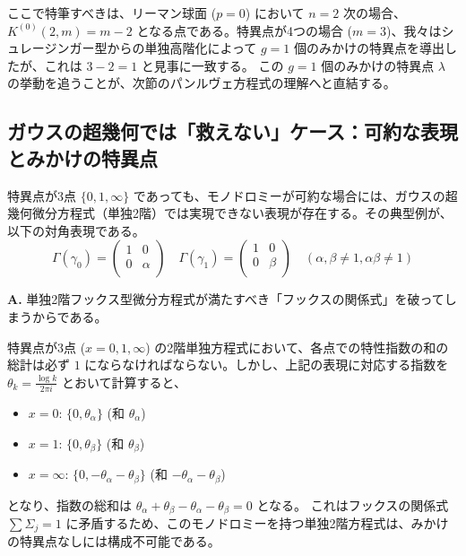 ここで特筆すべきは、リーマン球面 ($p=0$) において $n=2$ 次の場合、$K^{(0)}(2,m) = m-2$ となる点である。特異点が4つの場合 ($m=3$)、我々はシュレージンガー型からの単独高階化によって $g=1$ 個のみかけの特異点を導出したが、これは $3-2=1$ と見事に一致する。
この $g=1$ 個のみかけの特異点 $\lambda$ の挙動を追うことが、次節のパンルヴェ方程式の理解へと直結する。

\subsection*{ガウスの超幾何では「救えない」ケース：可約な表現とみかけの特異点}
特異点が3点 $\{0,1,\infty\}$ であっても、モノドロミーが可約な場合には、ガウスの超幾何微分方程式（単独2階）では実現できない表現が存在する。その典型例が、以下の対角表現である。
\[
\Gamma(\gamma_{0})=
\begin{pmatrix}
1&0\\
0&\alpha\\
\end{pmatrix}
\quad
\Gamma(\gamma_{1})=
\begin{pmatrix}
1&0\\
0&\beta\\
\end{pmatrix}
\quad (\alpha, \beta \neq 1, \alpha\beta \neq 1)
\]

\begin{Q}
\textbf{A.} 単独2階フックス型微分方程式が満たすべき「フックスの関係式」を破ってしまうからである。

特異点が3点 ($x=0,1,\infty$) の2階単独方程式において、各点での特性指数の和の総計は必ず $1$ にならなければならない。しかし、上記の表現に対応する指数を $\theta_k = \frac{\log k}{2\pi i}$ とおいて計算すると、
\begin{itemize}
    \item $x=0$: $\{0, \theta_\alpha\}$ \quad (和 $\theta_\alpha$)
    \item $x=1$: $\{0, \theta_\beta\}$ \quad (和 $\theta_\beta$)
    \item $x=\infty$: $\{0, -\theta_\alpha - \theta_\beta\}$ \quad (和 $-\theta_\alpha - \theta_\beta$)
\end{itemize}
となり、指数の総和は $\theta_\alpha + \theta_\beta - \theta_\alpha - \theta_\beta = 0$ となる。
これはフックスの関係式 $\sum \Sigma_j = 1$ に矛盾するため、このモノドロミーを持つ単独2階方程式は、みかけの特異点なしには構成不可能である。
\end{Q}

